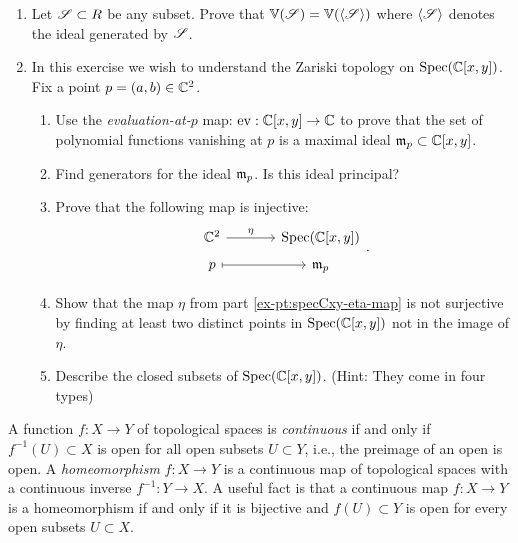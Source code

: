 \documentclass[12pt,reqno]{amsart}
\begin{document}
\begin{enumerate}[leftmargin=*]
\item Let $\mathcal{S} \subset R$ be any subset. Prove that $\mathbb{V}(\mathcal{S}) = \mathbb{V}(\langle \mathcal{S} \rangle)$ where $\langle \mathcal{S} \rangle$ denotes the ideal generated by $\mathcal{S}$. 

\item In this exercise we wish to understand the Zariski topology on $\operatorname{Spec}(\mathbb{C}[x,y])$. Fix a point $p=(a,b) \in \mathbb{C}^{2}$.
\begin{enumerate}[label=(\alph*),ref=\theenumi\alph*]
	\item Use the \emph{evaluation-at-$p$} map: $\operatorname{ev}: \mathbb{C}[x,y] \to \mathbb{C}$ to prove that the set of polynomial functions vanishing at $p$ is a maximal ideal $\mathfrak{m}_{p} \subset \mathbb{C}[x,y]$. 
	\item Find generators for the ideal $\mathfrak{m}_{p}$. Is this ideal principal?
	\item\label{ex-pt:specCxy-eta-map} Prove that the following map is injective:
	\[
	\begin{tikzcd}[row sep = .5em, column sep = 3.5em]
	\CC^{2} \arrow[r,"\eta"] & \Spec(\CC[x,y]) \\
	p \arrow[r,mapsto] & \fm_{p}
	\end{tikzcd}.
	\]
	\item Show that the map $\eta$ from part \ref{ex-pt:specCxy-eta-map} is not surjective by finding at least two distinct points in $\operatorname{Spec}(\mathbb{C}[x,y])$ not in the image of $\eta$. 
	\item Describe the closed subsets of $\operatorname{Spec}(\mathbb{C}[x,y])$. (Hint: They come in four types)
\end{enumerate}
\end{enumerate}

\hrulefill

A function $f: X \to Y$ of topological spaces is \emph{continuous} if and only if $f^{-1}(U) \subset X$ is open for all open subsets $U \subset Y$, i.e., the preimage of an open is open. A \emph{homeomorphism} $f: X \to Y$ is a continuous map of topological spaces with a continuous inverse $f^{-1}:Y \to X$. A useful fact is that a continuous map $f:X \to Y$ is a homeomorphism if and only if it is bijective and $f(U) \subset Y$ is open for every open subsets $U \subset X$. 
 
\hrulefill
\end{document}
